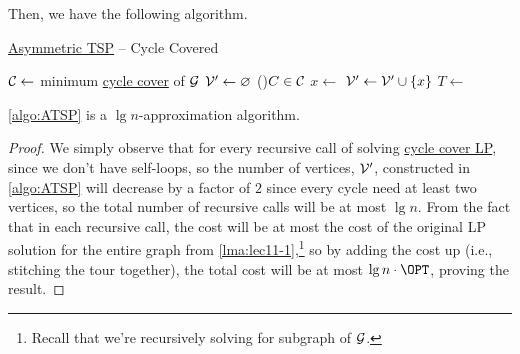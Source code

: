 Then, we have the following algorithm.

\begin{algorithm}[H]\label{algo:ATSP}
	\DontPrintSemicolon
	\caption{\hyperref[prb:ATSP]{Asymmetric TSP} -- Cycle Covered}
	\BlankLine
	\(\mathcal{\MakeUppercase{C}}\gets\) minimum \hyperref[subsec:cycle-covering-LP]{cycle cover} of \(\mathcal{\MakeUppercase{g}}\)\;
	\(\mathcal{\MakeUppercase{v}} ^\prime \gets \varnothing \)\;
	\For(){\(C\in \mathcal{\MakeUppercase{C}} \)}{
		\(x\gets\)
		\(\mathcal{\MakeUppercase{v}} ^\prime \gets \mathcal{\MakeUppercase{v}} ^\prime \cup \left\{ x \right\}\)\;
	}
	\(T\gets\)
	\;
	\;
\end{algorithm}

\begin{theorem}
	\autoref{algo:ATSP} is a \(\lg n\)-approximation algorithm.
\end{theorem}
\begin{proof}
	We simply observe that for every recursive call of solving \hyperref[subsec:cycle-covering-LP]{cycle cover LP}, since we don't have self-loops, so the number of vertices, \(\mathcal{\MakeUppercase{v}} ^\prime \), constructed in \autoref{algo:ATSP} will decrease by a factor of \(2\) since every cycle need at least two vertices, so the total number of recursive calls will be at most \(\lg n\). From the fact that in each recursive call, the cost will be at most the cost of the original LP solution for the entire graph from \autoref{lma:lec11-1},\footnote{Recall that we're recursively solving for subgraph of \(\mathcal{\MakeUppercase{g}} \).} so by adding the cost up (i.e., stitching the tour together), the total cost will be at most \(\lg n\cdot \OPT\), proving the result.
\end{proof}

